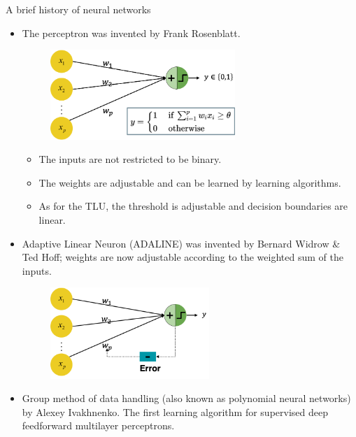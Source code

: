 \begin{vbframe}{A brief history of neural networks}
\begin{itemize}
\item {} The perceptron was invented by Frank Rosenblatt. 
\begin{figure}
\includegraphics[width=7cm]{figure/perceptron_new.png}
\end{figure}
\begin{itemize}
\vspace{2mm}
\item The inputs are not restricted to be binary.
\vspace{2mm}
\item %
The weights are adjustable and can be learned by learning algorithms.
\vspace{2mm}
\item %
As for the TLU, the threshold is adjustable and decision boundaries are linear.
\end{itemize}
\end{itemize}
\framebreak

\begin{itemize}
\item {} Adaptive Linear Neuron (ADALINE) was invented by Bernard Widrow \& Ted Hoff; weights are now adjustable according to the weighted sum of the inputs.
\vspace{.1cm}
\begin{figure}
\includegraphics[width=6cm]{figure/adaline.png}
\end{figure}
\item {} Group method of data handling (also known as polynomial neural networks) by Alexey Ivakhnenko. The first learning algorithm for supervised deep feedforward multilayer perceptrons.
\framebreak


\end{itemize}
\end{vbframe}

